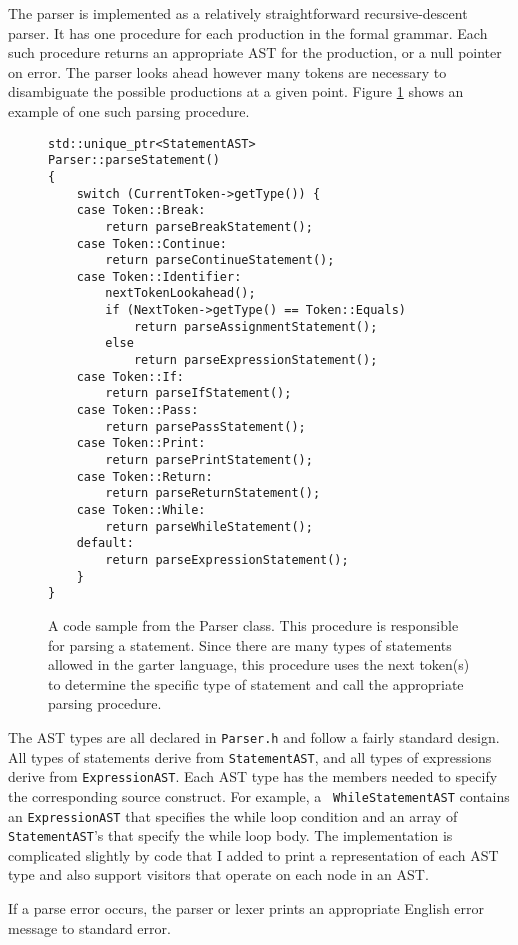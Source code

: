 \documentclass[11pt]{article}
\begin{document}
The parser is implemented as a relatively straightforward recursive-descent
parser.  It has one procedure for each production in the formal grammar.  Each
such procedure returns an appropriate AST for the production, or a null pointer
on error.  The parser looks ahead however many tokens are necessary to
disambiguate the possible productions at a given point.  Figure
\ref{fig:parseStatement} shows an example of one such parsing procedure.

\begin{figure}
\lstset{language=C++}
\begin{lstlisting}
std::unique_ptr<StatementAST>
Parser::parseStatement()
{
	switch (CurrentToken->getType()) {
	case Token::Break:
		return parseBreakStatement();
	case Token::Continue:
		return parseContinueStatement();
	case Token::Identifier:
		nextTokenLookahead();
		if (NextToken->getType() == Token::Equals)
			return parseAssignmentStatement();
		else
			return parseExpressionStatement();
	case Token::If:
		return parseIfStatement();
	case Token::Pass:
		return parsePassStatement();
	case Token::Print:
		return parsePrintStatement();
	case Token::Return:
		return parseReturnStatement();
	case Token::While:
		return parseWhileStatement();
	default:
		return parseExpressionStatement();
	}
}
\end{lstlisting}
\caption{A code sample from the Parser class.  This procedure is responsible for
parsing a statement.  Since there are many types of statements allowed in the
garter language, this procedure uses the next token(s) to determine the specific
type of statement and call the appropriate parsing procedure.  }
\label{fig:parseStatement}
\end{figure}

The AST types are all declared in {\tt Parser.h} and follow a fairly standard
design.  All types of statements derive from {\tt StatementAST}, and all types
of expressions derive from {\tt ExpressionAST}.  Each AST type has the members
needed to specify the corresponding source construct. For example, a {\tt
WhileStatementAST} contains an {\tt ExpressionAST} that specifies the while loop
condition and an array of {\tt StatementAST}'s that specify the while loop body.
The implementation is complicated slightly by code that I added to print a
representation of each AST type and also support visitors that operate on each
node in an AST.

If a parse error occurs, the parser or lexer prints an appropriate English error
message to standard error.
\end{document}
